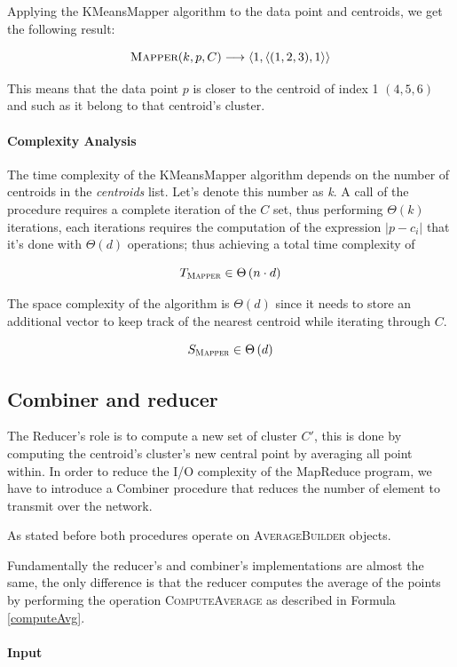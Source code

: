 \documentclass[parskip=full]{report}
\begin{document}
Applying the KMeansMapper algorithm to the data point and centroids, we get the following result:

\[
\textsc{Mapper}(k, p, C) \longrightarrow
\left\langle 1, \left\langle (1, 2, 3),1\right\rangle \right\rangle
\]

This means that the data point $p$ is closer to the centroid of index 1 $(4, 5, 
6)$ and such as it belong to that centroid's cluster.

\paragraph{Complexity Analysis}
The time complexity of the KMeansMapper algorithm depends on the number of 
centroids in the \textit{centroids} list. Let's denote this number as 
\textit{k}.
A call of the procedure requires a complete iteration of the $C$ set, thus 
performing $\Theta(k)$ iterations, each iterations requires the computation of 
the expression $|p - c_i|$ that it's done with $\Theta(d)$ operations; thus 
achieving a total time complexity of

\[
T_\textsc{Mapper} \in \Theta \left(n \cdot d\right)
\]

The space complexity of the algorithm is $\Theta(d)$ since it needs to store an 
additional vector to keep track of the nearest centroid while iterating through 
$C$.

\[
S_\textsc{Mapper} \in \Theta \left(d\right)
\]

\subsection{Combiner and reducer}
The Reducer's role is to compute a new set of cluster $C'$, this is done by 
computing the centroid's cluster's new central point by averaging all point 
within. In order to reduce the I/O complexity of the MapReduce program, we have 
to introduce a Combiner procedure that reduces the number of element to 
transmit over the network.

As stated before both procedures operate on \textsc{AverageBuilder} objects.

Fundamentally the reducer's and combiner's implementations are almost the same, 
the only difference is that the reducer computes the average of the points by 
performing the operation \textsc{ComputeAverage} as described in Formula 
\ref{computeAvg}.

\paragraph{Input}
\end{document}
